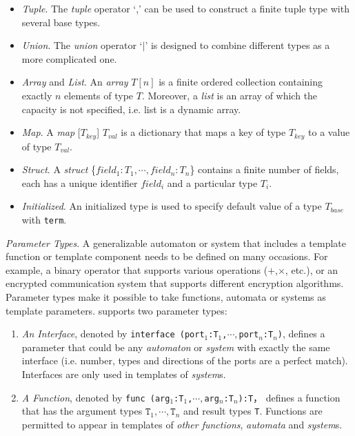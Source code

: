 \begin{itemize}
    \item \emph{Tuple}. The \emph{tuple} operator `,' can be used to construct a finite tuple type with several base types.
    \item \emph{Union}. The \emph{union} operator `$|$' is designed to combine different types as a more complicated one. 
    \item \emph{Array} and \emph{List}. An \emph{array} $T[n]$ is a finite ordered collection containing exactly $n$ elements of type $T$. Moreover, a \emph{list} is an array of which the capacity is not specified, i.e. list is a dynamic array.
    \item \emph{Map}. A \emph{map }[$T_{key}$] $T_{val}$ is a dictionary that maps a key of type $T_{key}$ to a value of type $T_{val}$.
    \item \emph{Struct}. A \emph{struct }\{$field_1:T_1,\cdots,field_n:T_n$\} contains a finite number of fields, each has  a unique identifier $field_i$ and a particular type $T_i$.
    \item \emph{Initialized}. An initialized type is used to specify default value of a type $T_{base}$ with \texttt{term}.
\end{itemize}

\noindent\emph{Parameter Types}. A generalizable automaton or system that includes a template function or template component needs to be defined on many occasions. For example, a binary operator that supports various operations ($+$,$\times$, etc.), or an encrypted communication system that supports different encryption algorithms. Parameter types make it possible to take functions, automata or systems as template parameters. \lang{} supports two parameter types: 
\begin{enumerate}
    \item \emph{An Interface}, denoted by \texttt{interface (port$_1$:T$_1$,$\cdots,$port$_n$:T$_n$)}, defines a parameter that could be any \emph{automaton} or \emph{system} with exactly the same interface (i.e. number, types and directions of the ports are a perfect match). Interfaces are only used in templates of \emph{system}s.
    \item \emph{A Function}, denoted by \texttt{func (arg$_1$:T$_1$,$\cdots, $arg$_n$:T$_n$):T}， defines a function that has the argument types $\texttt{T}_1,\cdots,\texttt{T}_n$ and result types \texttt{T}. Functions are permitted to appear in templates of \emph{other functions}, \emph{automata} and \emph{system}s.
\end{enumerate}

